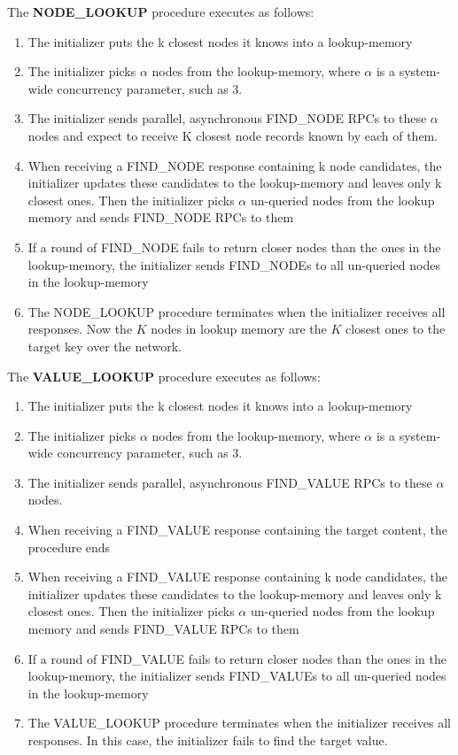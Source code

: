 \noindent The \textbf{NODE\_LOOKUP} procedure executes as follows:
\begin{enumerate}[label=(\roman*)]
  \item The initializer puts the k closest nodes it knows into a lookup-memory
  \item The initializer picks $\alpha$ nodes from the lookup-memory, where $\alpha$ is a system-wide concurrency parameter, such as 3.
  \item The initializer sends parallel, asynchronous FIND\_NODE RPCs to these $\alpha$ nodes and expect to receive K closest node records known by each of them.
  \item When receiving a FIND\_NODE response containing k node candidates, the initializer updates these candidates to the lookup-memory and leaves only k closest ones. Then the initializer picks $\alpha$ un-queried nodes from the lookup memory and sends FIND\_NODE RPCs to them
  \item If a round of FIND\_NODE fails to return closer nodes than the ones in the lookup-memory, the initializer sends FIND\_NODEs to all un-queried nodes in the lookup-memory
  \item The NODE\_LOOKUP procedure terminates when the initializer receives all responses. Now the $K$ nodes in lookup memory are the $K$ closest ones to the target key over the network.
\end{enumerate}

\newpage

\noindent The \textbf{VALUE\_LOOKUP} procedure executes as follows:
\begin{enumerate}[label=(\roman*)]
  \item The initializer puts the k closest nodes it knows into a lookup-memory
  \item The initializer picks $\alpha$ nodes from the lookup-memory, where $\alpha$ is a system-wide concurrency parameter, such as 3.
  \item The initializer sends parallel, asynchronous FIND\_VALUE RPCs to these $\alpha$ nodes.
  \item When receiving a FIND\_VALUE response containing the target content, the procedure ends
  \item When receiving a FIND\_VALUE response containing k node candidates, the initializer updates these candidates to the lookup-memory and leaves only k closest ones. Then the initializer picks $\alpha$ un-queried nodes from the lookup memory and sends FIND\_VALUE RPCs to them
  \item If a round of FIND\_VALUE fails to return closer nodes than the ones in the lookup-memory, the initializer sends FIND\_VALUEs to all un-queried nodes in the lookup-memory
  \item The VALUE\_LOOKUP procedure terminates when the initializer receives all responses. In this case, the initializer fails to find the target value.
\end{enumerate}

